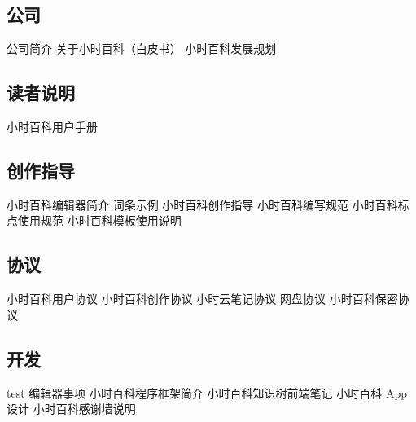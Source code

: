 
\subsection{公司}
公司简介
关于小时百科（白皮书）
小时百科发展规划

\subsection{读者说明}
小时百科用户手册

\subsection{创作指导}
小时百科编辑器简介
词条示例
小时百科创作指导
小时百科编写规范
小时百科标点使用规范
小时百科模板使用说明

\subsection{协议}
小时百科用户协议
小时百科创作协议
小时云笔记协议
网盘协议
小时百科保密协议

\subsection{开发}
test
编辑器事项
小时百科程序框架简介
小时百科知识树前端笔记
小时百科 App 设计
小时百科感谢墙说明
